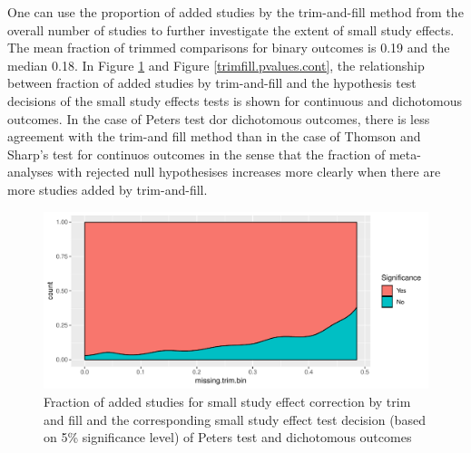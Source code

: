 \documentclass[11pt,a4paper,twoside]{book}\usepackage[]{graphicx}\usepackage[]{color}
\newenvironment{knitrout}{}{} %
\begin{document}
\vspace{0mm}
One can use the proportion of added studies by the trim-and-fill method from the overall number of studies to further investigate the extent of small study effects. The mean fraction of trimmed comparisons for binary outcomes is 0.19 and the median 0.18. 
In Figure \ref{trimfill.pvalues.bin} and Figure \ref{trimfill.pvalues.cont}, the relationship between fraction of added studies by trim-and-fill and the hypothesis test decisions of the small study effects tests is shown for continuous and dichotomous outcomes. In the case of Peters test dor dichotomous outcomes, there is less agreement with the trim-and fill method than in the case of Thomson and Sharp's test for continuos outcomes in the sense that the fraction of meta-analyses with rejected null hypothesises increases more clearly when there are more studies added by trim-and-fill. 

\begin{figure}
\begin{knitrout}
\color{fgcolor}

{\centering \includegraphics[width=\textwidth-3cm]{figure/ch02_figunnamed-chunk-34-1} 

}



\end{knitrout}
\caption{Fraction of added studies for small study effect correction by trim and fill and the corresponding small study effect test decision (based on 5\% significance level) of Peters test and dichotomous outcomes}
\label{trimfill.pvalues.bin}
\end{figure}
\end{document}
